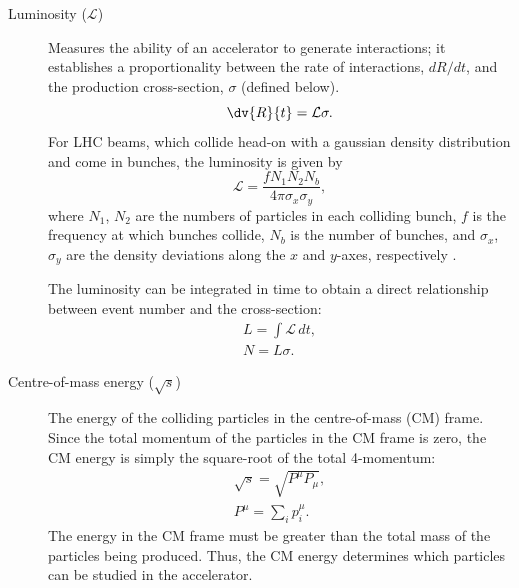 \begin{description}
    \item[Luminosity ($\mathcal{L}$)] Measures the ability of an accelerator to generate interactions; it establishes a proportionality between the rate of interactions, $dR/dt$, and the production cross-section, $\sigma$ (defined below).
    \begin{equation}
        \dv{R}{t} = \mathcal{L} \sigma.
    \end{equation}
    For LHC beams, which collide head-on with a gaussian density distribution and come in bunches, the luminosity is given by $$\mathcal{L} = \frac{f N_1 N_2 N_b}{4\pi \sigma_x \sigma_y},$$ where $N_1$, $N_2$ are the numbers of particles in each colliding bunch, $f$ is the frequency at which bunches collide, $N_b$ is the number of bunches, and $\sigma_{x}$, $\sigma_{y}$ are the density deviations along the $x$ and $y$-axes, respectively \cite{herr-luminosity,thomson_modern_2013}.
    
    The luminosity can be integrated in time to obtain a direct relationship between event number and the cross-section:
    \begin{align}
        L = \int \mathcal{L}\, dt,\\
        N = L\sigma.
    \end{align}
    
    \item[Centre-of-mass energy ($\sqrt{s}$)] The energy of the colliding particles in the centre-of-mass (CM) frame. Since the total momentum of the particles in the CM frame is zero, the CM energy is simply the square-root of the total 4-momentum:
    \begin{align}
        \sqrt{s} = \sqrt{P^\mu P_\mu},\\
        P^\mu = \sum_{i} p^{\mu}_{i}.
    \end{align}
    The energy in the CM frame must be greater than the total mass of the particles being produced. Thus, the CM energy determines which particles can be studied in the accelerator.
    
\end{description}

